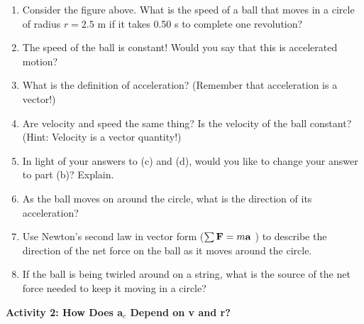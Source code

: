 \begin{enumerate}

\item Consider the figure above. What is the speed of a ball that moves in a circle
of radius $r = 2.5$ m if it takes 0.50 s to complete one revolution?
\vspace{18mm}

\item The speed of the ball is constant! Would you say that this is accelerated
motion?
\vspace{18mm}

\item What is the definition of acceleration? (Remember that acceleration is a
vector!)
\vspace{18mm}

\item Are velocity and speed the same thing? Is the velocity of the ball constant?
(Hint: Velocity is a vector quantity!)
\vspace{18mm}

\item In light of your answers to (c) and (d), would you like to change your answer
to part (b)? Explain.
\vspace{18mm}

\item As the ball moves on around the circle, what is the direction of its acceleration?
\vspace{18mm}

\item Use Newton's second law in vector form (\( \sum {\bf F} = m{\bf a}\)
) to describe the direction of the net force on the ball as it moves around
the circle.
\vspace{18mm}

\item If the ball is being twirled around on a string, what is the source of the
net force needed to keep it moving in a circle?
\vspace{18mm}

\end{enumerate}

\newpage 

\textbf{Activity 2: How Does a\( _{c} \) Depend on v and r?} 

